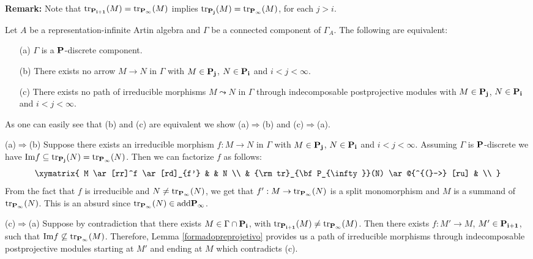 \par\noindent
{\bf Remark:} Note that ${\rm tr}_{\bf P_{i+1}}(M)={\rm tr}_{\bf P_{\infty}}(M)$ implies ${\rm tr}_{\bf P_{j}}(M)={\rm tr}_{\bf P_{\infty}}(M)$, for each $j>i$. 

\begin{prop}
\label{caracterizacao}
Let $A$ be a representation-infinite Artin algebra and $\Gamma$ be a connected component of $\Gamma_A$. The following are equivalent:

\begin{enumerate}
\item[(a)] $\Gamma$ is a $\bf{P}$-discrete component.
\item[(b)] There exists no arrow $M \rightarrow N$ in $\Gamma$ with $M \in \bf{P_j}$, $N \in \bf{P_i}$ and $i<j<{\infty}$.
\item[(c)] There exists no path of irreducible morphisms $M \leadsto N$ in $\Gamma$ through indecomposable postprojective modules with $M \in \bf{P_j}$, $N \in \bf{P_i}$ and $i<j<{\infty}$.
\end{enumerate}
\end{prop}

\begin{pf}
As one can easily see that (b) and (c) are equivalent we show (a)$\Rightarrow $(b)  and (c)$\Rightarrow $(a).

(a)$\Rightarrow $(b) 
Suppose there exists an irreducible morphism $f:M \rightarrow N$ in $\Gamma$ with $M \in \bf{P_j}$, $N \in \bf{P_i}$ and $i<j<{\infty}$. Assuming  $\Gamma$ is $\bf{P}$-discrete we have ${\rm Im}f \subseteq {\rm tr}_{\bf P_{j}}(N) = {\rm tr}_{\bf P_{\infty}}(N)$. Then we can factorize $f$ as follows:
$$\xymatrix{
M \ar[rr]^f  \ar[rd]_{f'}  & & N \\
     & {\rm tr}_{\bf P_{\infty}}(N) \ar @{^{(}->} [ru] &  \\
}$$
From the fact that $f$ is irreducible and $N \neq {\rm tr}_{\bf P_{\infty}}(N)$, we get that $f':M \rightarrow {\rm tr}_{\bf P_{\infty}}(N)$ is a split monomorphism and $M$ is a summand of ${\rm tr}_{\bf P_{\infty}}(N)$. This is an absurd since ${\rm tr}_{\bf P_{\infty}}(N) \in {\rm add}\bf{P_{\infty}}$.

(c)$\Rightarrow $(a)  
Suppose by contradiction that there exists $M \in \Gamma \cap \bf{P_i}$, with ${\rm tr}_{\bf P_{i+1}}(M) \neq {\rm tr}_{\bf P_{\infty}}(M)$. Then there exists $f: M' \rightarrow M$, $M' \in \bf{P_{i+1}}$, such that ${\rm Im}f \not\subseteq {\rm tr}_{\bf P_{\infty}}(M)$. Therefore, Lemma \ref{formadopreprojetivo} provides us a path of irreducible morphisms through indecomposable postprojective modules starting at $M'$ and ending at $M$ which contradicts (c). 
\end{pf}

